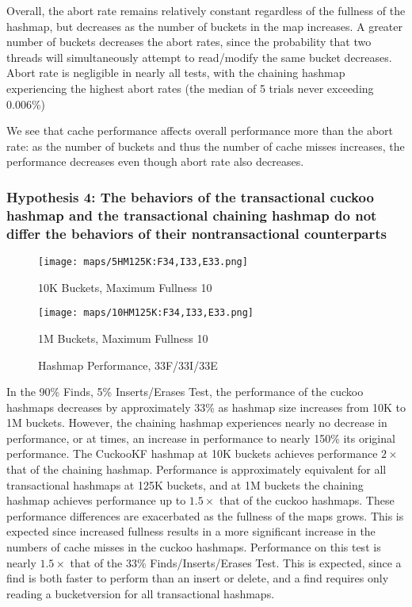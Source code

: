 Overall, the abort rate remains relatively constant regardless of the fullness of the hashmap, but decreases as the number of buckets in the map increases. A greater number of buckets decreases the abort rates, since the probability that two threads will simultaneously attempt to read/modify the same bucket decreases. Abort rate is negligible in nearly all tests, with the chaining hashmap experiencing the highest abort rates (the median of 5 trials never exceeding 0.006\%)

We see that cache performance affects overall performance more than the abort rate: as the number of buckets and thus the number of cache misses increases, the performance decreases even though abort rate also decreases.

\subsubsection{Hypothesis 4: The behaviors of the transactional cuckoo hashmap and the transactional chaining hashmap do not differ the behaviors of their nontransactional counterparts}

\begin{figure}[t]
    \centering
	\begin{minipage}{0.45\textwidth}\texttt{[image: maps/5HM125K:F34,I33,E33.png]} 
        \caption*{10K Buckets, Maximum Fullness 10}
    \end{minipage}
	\begin{minipage}{0.45\textwidth}\texttt{[image: maps/10HM125K:F34,I33,E33.png]} 
        \caption*{1M Buckets, Maximum Fullness 10}
    \end{minipage}
	\caption{Hashmap Performance, 33F/33I/33E}
\end{figure}

In the 90\% Finds, 5\% Inserts/Erases Test, the performance of the cuckoo hashmaps decreases by approximately 33\% as hashmap size increases from 10K to 1M buckets. However, the chaining hashmap experiences nearly no decrease in performance, or at times, an increase in performance to nearly 150\% its original performance. The CuckooKF hashmap at 10K buckets achieves performance $2\times$ that of the chaining hashmap. Performance is approximately equivalent for all transactional hashmaps at 125K buckets, and at 1M buckets the chaining hashmap achieves performance up to $1.5\times$ that of the cuckoo hashmaps. These performance differences are exacerbated as the fullness of the maps grows. This is expected since increased fullness results in a more significant increase in the numbers of cache misses in the cuckoo hashmaps.
 Performance on this test is nearly $1.5\times$ that of the 33\% Finds/Inserts/Erases Test. This is expected, since a find is both faster to perform than an insert or delete, and a find requires only reading a bucketversion for all transactional hashmaps.

